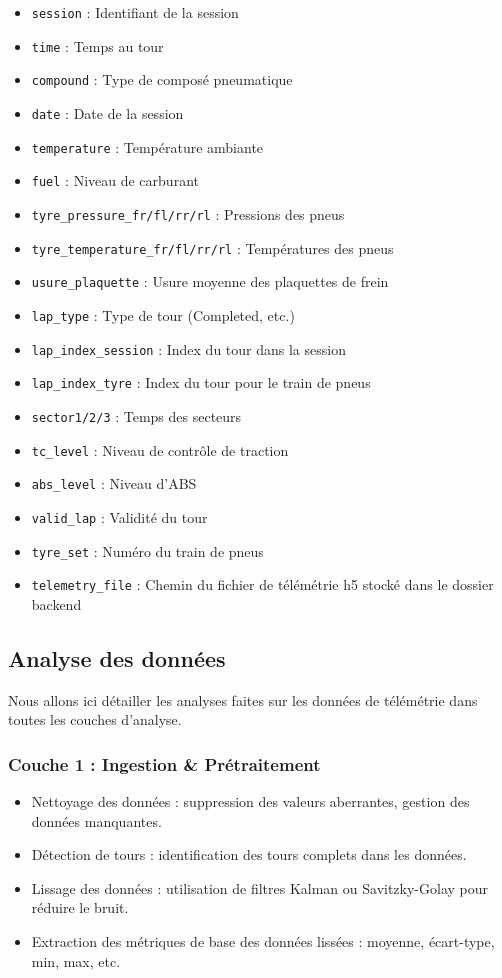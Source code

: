\documentclass[a4paper,12pt]{report}
\begin{document}
\begin{itemize}
    \item \texttt{session} : Identifiant de la session
    \item \texttt{time} : Temps au tour
    \item \texttt{compound} : Type de composé pneumatique
    \item \texttt{date} : Date de la session
    \item \texttt{temperature} : Température ambiante
    \item \texttt{fuel} : Niveau de carburant
    \item \texttt{tyre\_pressure\_fr/fl/rr/rl} : Pressions des pneus
    \item \texttt{tyre\_temperature\_fr/fl/rr/rl} : Températures des pneus
    \item \texttt{usure\_plaquette} : Usure moyenne des plaquettes de frein
    \item \texttt{lap\_type} : Type de tour (Completed, etc.)
    \item \texttt{lap\_index\_session} : Index du tour dans la session
    \item \texttt{lap\_index\_tyre} : Index du tour pour le train de pneus
    \item \texttt{sector1/2/3} : Temps des secteurs
    \item \texttt{tc\_level} : Niveau de contrôle de traction
    \item \texttt{abs\_level} : Niveau d'ABS
    \item \texttt{valid\_lap} : Validité du tour
    \item \texttt{tyre\_set} : Numéro du train de pneus
    \item \texttt{telemetry\_file} : Chemin du fichier de télémétrie h5 stocké dans le dossier backend
\end{itemize}

\subsection{Analyse des données}

Nous allons ici détailler les analyses faites sur les données de télémétrie dans toutes les couches d'analyse.

\subsubsection{Couche 1 : Ingestion \& Prétraitement}
\begin{itemize}
    \item Nettoyage des données : suppression des valeurs aberrantes, gestion des données manquantes.
    \item Détection de tours : identification des tours complets dans les données.
    \item Lissage des données : utilisation de filtres Kalman ou Savitzky-Golay pour réduire le bruit.
    \item Extraction des métriques de base des données lissées : moyenne, écart-type, min, max, etc.
\end{itemize}
\end{document}
